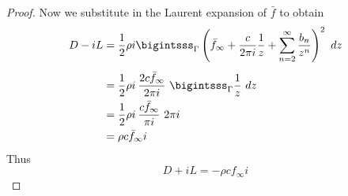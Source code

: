 \documentclass[letterpaper, twoside, 12 pt]{article}
\begin{document}
\begin{proof}
		Now we substitute in the Laurent expansion of $\bar f$ to obtain
		\begin{align*}
			D - iL &= \frac{1}{2} \rho i \bigintsss_\Gamma \left( \bar f_\infty + \frac{c}{2 \pi i} \frac{1}{z} + \sum_{n=2}^\infty \frac{b_n}{z^n} \right)^2 \ dz \\[1 ex]
			&= \frac{1}{2} \rho i \> \frac{2 c \bar f_\infty}{2 \pi i} \ \bigintsss_\Gamma \frac{1}{z} \ dz \\
			&= \frac{1}{2} \rho i \> \frac{c \bar f_\infty}{\pi i} \ 2 \pi i \\
			&= \rho c \bar f_\infty i
		\end{align*}
		Thus
		\[
			D + iL = - \rho c f_\infty i
		\]
	\end{proof}


\clearpage
\nocite{*}


\end{document}
